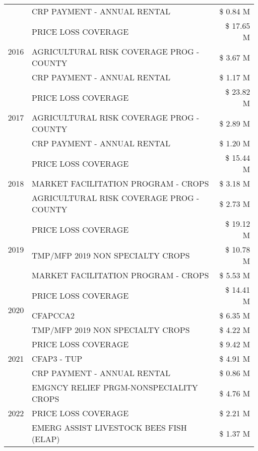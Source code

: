 \begin{tabular}{llr}
 & CRP PAYMENT - ANNUAL RENTAL & \$ 0.84 M \\
\cline{1-3}
\multirow[t]{3}{*}{2016} & PRICE LOSS COVERAGE & \$ 17.65 M \\
 & AGRICULTURAL RISK COVERAGE PROG - COUNTY & \$ 3.67 M \\
 & CRP PAYMENT - ANNUAL RENTAL & \$ 1.17 M \\
\cline{1-3}
\multirow[t]{3}{*}{2017} & PRICE LOSS COVERAGE & \$ 23.82 M \\
 & AGRICULTURAL RISK COVERAGE PROG - COUNTY & \$ 2.89 M \\
 & CRP PAYMENT - ANNUAL RENTAL & \$ 1.20 M \\
\cline{1-3}
\multirow[t]{3}{*}{2018} & PRICE LOSS COVERAGE & \$ 15.44 M \\
 & MARKET FACILITATION PROGRAM - CROPS & \$ 3.18 M \\
 & AGRICULTURAL RISK COVERAGE PROG - COUNTY & \$ 2.73 M \\
\cline{1-3}
\multirow[t]{3}{*}{2019} & PRICE LOSS COVERAGE & \$ 19.12 M \\
 & TMP/MFP 2019 NON SPECIALTY CROPS & \$ 10.78 M \\
 & MARKET FACILITATION PROGRAM - CROPS & \$ 5.53 M \\
\cline{1-3}
\multirow[t]{3}{*}{2020} & PRICE LOSS COVERAGE & \$ 14.41 M \\
 & CFAPCCA2 & \$ 6.35 M \\
 & TMP/MFP 2019 NON SPECIALTY CROPS & \$ 4.22 M \\
\cline{1-3}
\multirow[t]{3}{*}{2021} & PRICE LOSS COVERAGE & \$ 9.42 M \\
 & CFAP3 - TUP & \$ 4.91 M \\
 & CRP PAYMENT - ANNUAL RENTAL & \$ 0.86 M \\
\cline{1-3}
\multirow[t]{3}{*}{2022} & EMGNCY RELIEF PRGM-NONSPECIALITY CROPS & \$ 4.76 M \\
 & PRICE LOSS COVERAGE & \$ 2.21 M \\
 & EMERG ASSIST LIVESTOCK BEES FISH (ELAP) & \$ 1.37 M \\
\cline{1-3}
\bottomrule
\end{tabular}
